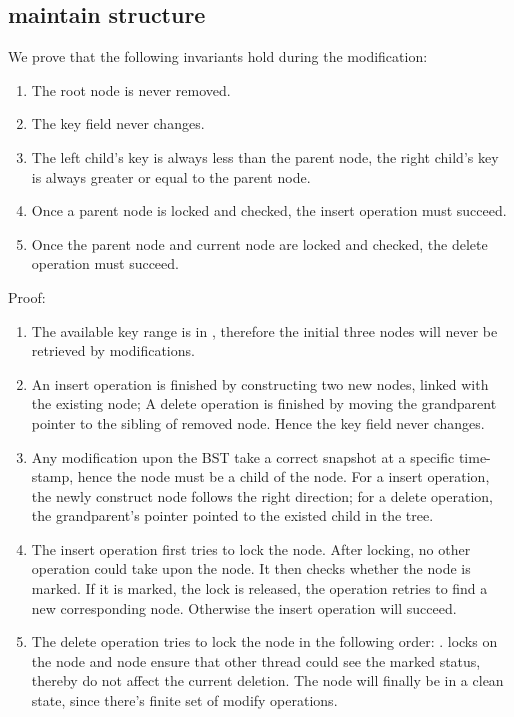 \documentclass{article}
\begin{document}
\subsection{maintain structure}
We prove that the following invariants hold during the modification:
\begin{enumerate}
\item The root node is never removed.
\item The key field never changes.
\item The left child's key is always less than the parent node, the right child's key is always greater or equal to the parent node.
\item Once a parent node is locked and checked, the insert operation must succeed.
\item Once the parent node and current node are locked and checked, the delete operation must succeed.
\end{enumerate}
Proof:
\begin{enumerate}
\item The available key range is in , therefore the initial three nodes will never be retrieved by modifications.
\item An insert operation is finished by constructing two new nodes, linked with the existing node; A delete operation is finished by moving the grandparent pointer to the sibling of removed node. Hence the key field never changes.
\item Any modification upon the BST take a correct snapshot at a specific time-stamp, hence the  node must be a child of the  node. For a insert operation, the newly construct node follows the right direction; for a delete operation, the grandparent's pointer pointed to the existed child in the tree.
\item The insert operation first tries to lock the  node. After locking, no other operation could take upon the  node. It then checks whether the  node is marked. If it is marked, the  lock is released, the operation retries to find a new corresponding node. Otherwise the insert operation will succeed. 
\item The delete operation tries to lock the node in the following order: . locks on the  node and  node ensure that other thread could see the marked status, thereby do not affect the current deletion. The  node will finally be in a clean state, since there's finite set of modify operations. 
\end{enumerate}
\end{document}
